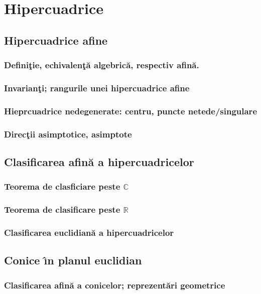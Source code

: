 \documentclass[12pt]{book}
\def\C{\mathbb C}
\def\R{\mathbb R}
\begin{document}
\chapter{ Hipercuadrice}

\section{ Hipercuadrice afine}
\subsection{Defini\c tie, echivalen\c t\u a algebric\u a, respectiv afin\u a.}
\subsection{Invarian\c ti; rangurile unei hipercuadrice afine}
\subsection{Hieprcuadrice nedegenerate: centru, puncte netede/singulare}
\subsection{Direc\c tii asimptotice, asimptote}

\section{Clasificarea afin\u a a hipercuadricelor}
\subsection{Teorema  de clasficiare peste $\C$}
\subsection{Teorema de clasificare peste $\R$}

\subsection{Clasificarea euclidian\u a a hipercuadricelor}


\section{Conice \^{\i}n planul euclidian}
\subsection{Clasificarea afin\u a a conicelor; reprezent\u ari geometrice}
\end{document}
